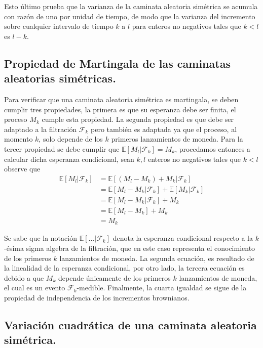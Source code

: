 \documentclass[11pt,notitlepage]{article}
\begin{document}
 
Esto último prueba que la varianza de la caminata aleatoria simétrica se acumula con razón de uno por unidad de tiempo, de modo que la varianza del incremento sobre cualquier intervalo de tiempo \(k\) a \(l\) para enteros no negativos tales que \(k<l\) es \(l-k\).

\subsection{Propiedad de Martingala de las caminatas aleatorias simétricas.} 
Para verificar que una caminata aleatoria simétrica es martingala, se deben cumplir tres propiedades, la primera es que su esperanza debe ser finita, el proceso \(M_{k}\) cumple esta propiedad. La segunda propiedad es que debe ser adaptado a la filtración \(\mathcal{F}_{k}\) pero también es adaptada ya que el proceso, al momento \(k\), solo depende de los \(k\) primeros lanzamientos de moneda. Para la tercer propiedad se debe cumplir que \(\mathbb{E}[M_{l}|\mathcal{F}_{k}]=M_{k}\), procedamos entonces a calcular dicha esperanza condicional, sean \(k,l\) enteros no negativos tales que \(k<l\) observe que
\begin{align*}
    \mathbb{E}[M_{l}|\mathcal{F}_{k}]&=\mathbb{E}\left [ \left ( M_{l}-M_{k} \right )+M_{k}|\mathcal{F}_{k} \right ]\\
    &=\mathbb{E}[M_{l}-M_{k}|\mathcal{F}_{k}]+\mathbb{E}[M_{k}|\mathcal{F}_{k}]\\
    &=\mathbb{E}[M_{l}-M_{k}|\mathcal{F}_{k}]+M_{k}\\
    &=\mathbb{E}[M_{l}-M_{k}] + M_{k}\\
    &=M_{k}  
\end{align*}

 Se sabe que la notación \(\mathbb{E}[...|\mathcal{F}_{k}]\) denota la esperanza condicional respecto a la \(k\)-ésima sigma algebra de la filtración, que en este caso representa el conocimiento de los primeros \(k\) lanzamientos de moneda. 
La segunda ecuación, es resultado de la linealidad de la esperanza condicional, por otro lado, la tercera ecuación es debido a que  \(M_{k}\) depende únicamente de los primeros  \(k\) lanzamientos de moneda, el cual es un evento \(\mathcal{F}_{k}\)-medible. Finalmente, la cuarta igualdad se sigue de la propiedad de independencia de los incrementos brownianos.



\subsection{Variación cuadrática de una caminata aleatoria simétrica.}
\end{document}
